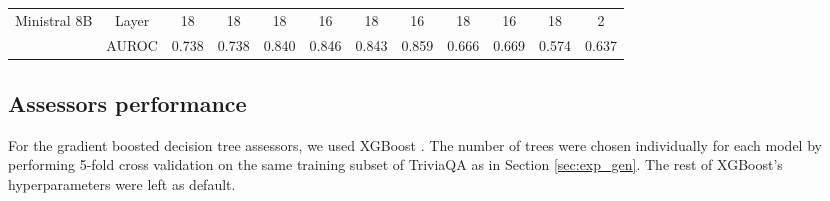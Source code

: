 \documentclass{article} %
\begin{document}
\begin{table}[!ht]
{\begin{tabular}{p{2.5cm} c c c c c c c c c c c}
    \midrule
    
    \multirow{2}{*}{\parbox{2.5cm}{\centering Ministral 8B}} & Layer & 18 & 18 & 18 & 16 & 18 & 16 & 18 & 16 & 18 & 2 \\
& AUROC & 0.738 & 0.738 & 0.840 & 0.846 & 0.843 & 0.859 & 0.666 & 0.669 & 0.574 & 0.637 \\

    \midrule

  \end{tabular}}
\end{table}

\subsection{Assessors performance}
\label{sec:assessors}

For the gradient boosted decision tree assessors, we used XGBoost \citep{chen2016xgboost}. The number of trees were chosen individually for each model by performing 5-fold cross validation on the same training subset of TriviaQA as in Section \ref{sec:exp_gen}. The rest of XGBoost's hyperparameters were left as default.
\end{document}
